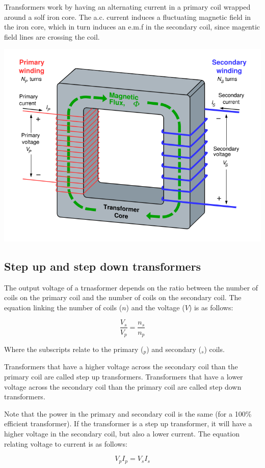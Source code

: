 \documentclass{article}
\begin{document}
Transformers work by having an alternating current in a primary coil wrapped
around a solf iron core. The a.c. current induces a fluctuating magnetic field
in the iron core, which in turn induces an e.m.f in the secondary coil, since
magentic field lines are crossing the coil.

\begin{center}
	\includegraphics[scale=0.4]{transformer}
\end{center}

\subsection*{Step up and step down transformers}

The output voltage of a trnasformer depends on the ratio between the number of
coils on the primary coil and the number of coils on the secondary coil. The
equation linking the number of coils ($n$) and the voltage ($V$) is as follows:

\[
	\frac{V_s}{V_p} = \frac{n_s}{n_p}
\]

Where the subscripts relate to the primary ($_p$) and secondary ($_s$) coils.

Transformers that have a higher voltage across the secondary coil than the
primary coil are called step up transformers. Transformers that have a lower
voltage across the secondary coil than the primary coil are called step down
transformers.

Note that the power in the primary and secondary coil is the same (for a 100\%
efficient transformer). If the transformer is a step up transformer, it will
have a higher voltage in the secondary coil, but also a lower current. The
equation relating voltage to current is as follows:

\[
	V_pI_p = V_sI_s
\]
\end{document}
